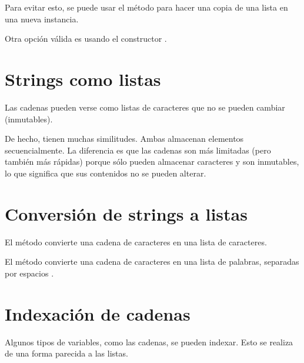 Para evitar esto, se puede usar el método  para hacer una copia de una lista en una nueva instancia.


Otra opción válida es usando el constructor .


\section{Strings como listas}

Las cadenas pueden verse como listas de caracteres que no se pueden cambiar (inmutables).


De hecho, tienen muchas similitudes.
Ambas almacenan elementos secuencialmente.
La diferencia es que las cadenas son más limitadas (pero también más rápidas) porque sólo pueden almacenar caracteres y son inmutables, lo que significa que sus contenidos no se pueden alterar.

\section{Conversión de strings a listas}

El método  convierte una cadena de caracteres en una lista de caracteres.


El método  convierte una cadena de caracteres en una lista de palabras, separadas por espacios \ttt{\qq  \qq}.


\section{Indexación de cadenas}

Algunos tipos de variables, como las cadenas, se pueden indexar. Esto se realiza de una forma parecida a las listas.


